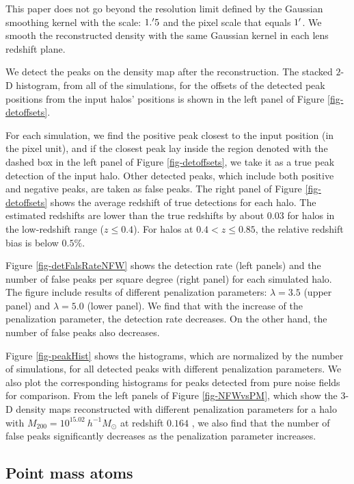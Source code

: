 \documentclass[twocolumn]{aastex62}
\begin{document}
This paper does not go beyond the resolution limit defined by the Gaussian
smoothing kernel with the scale: $1.\mbox{$^\prime$} 5$ and the pixel scale
that equals $1\mbox{$^\prime$}$. We smooth the reconstructed density with the same
Gaussian kernel in each lens redshift plane.

We detect the peaks on the density map after the reconstruction. The stacked
$2$-D histogram, from all of the simulations, for the offsets of the detected
peak positions from the input halos' positions is shown in the left panel of
Figure \ref{fig-detoffsets}.

For each simulation, we find the positive peak closest to the input position
(in the pixel unit), and if the closest peak lay inside the region denoted with
the dashed box in the left panel of Figure \ref{fig-detoffsets}, we take it as
a true peak detection of the input halo. Other detected peaks, which include both
positive and negative peaks, are taken as false peaks. The right
panel of Figure \ref{fig-detoffsets} shows the average redshift of true
detections for each halo. The estimated redshifts are lower than the true
redshifts by about $0.03$ for halos in the low-redshift range ($z\leq 0.4$).
For halos at $0.4<z\leq 0.85$, the relative redshift bias is below $0.5\%$.

Figure \ref{fig-detFalsRateNFW} shows the detection rate (left panels) and the
number of false peaks per square degree (right panel) for each simulated halo.
The figure include results of different penalization parameters: $\lambda=3.5$
(upper panel) and $\lambda=5.0$ (lower panel).  We find that with the increase
of the penalization parameter, the detection rate decreases. On the other hand,
the number of false peaks also decreases.

Figure \ref{fig-peakHist} shows the histograms, which are normalized by the
number of simulations, for all detected peaks with different penalization
parameters. We also plot the corresponding histograms for peaks detected from
pure noise fields for comparison. From the left panels of Figure
\ref{fig-NFWvsPM}, which show the $3$-D density maps reconstructed with
different penalization parameters for a halo with $M_{200}=10^{15.02}
~h^{-1}M_{\odot}$ at redshift $0.164$ , we also find that the number of false
peaks significantly decreases as the penalization parameter increases.


\subsection{Point mass atoms}
\label{subsec:test-pm}
\end{document}
